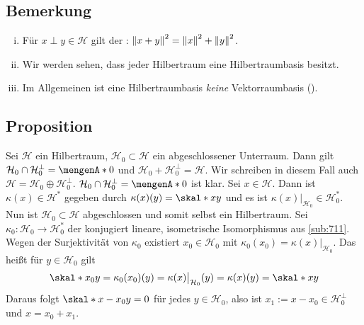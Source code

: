 \subsection[Bemerkung: Satz von Pythagoras, Vergleich Hilbertraumbasis mit Vektorbasis]{Bemerkung} %
\label{sub:714}
\begin{enumerate}[(i)]
	\item Für $x \perp y \in \mathcal{H}$ gilt der : $\norm{x+y}^2 = \norm{x}^2  + \norm{y}^2$.
	\item Wir werden sehen, dass jeder Hilbertraum eine Hilbertraumbasis besitzt.
	\item Im Allgemeinen ist eine Hilbertraumbasis \emph{keine} Vektorraumbasis ().
\end{enumerate}

\subsection[Proposition: Für einen abgeschlossenen Unterraum $\mathcal{H}_0$ gilt $\mathcal{H}= \mathcal{H}_0 \oplus \mathcal{H}_0^\bot$]{Proposition} %
\label{sub:715}
Sei $\mathcal{H}$ ein Hilbertraum, $\mathcal{H}_0 \subset \mathcal{H}$ ein abgeschlossener Unterraum. Dann gilt $\mathcal{H}_0 \cap \mathcal{H}_0^\bot = \set{0}$ und 
$\mathcal{H}_0 + \mathcal{H}_0^\bot = \mathcal{H}$. Wir schreiben in diesem Fall auch $\mathcal{H} = \mathcal{H}_0 \oplus \mathcal{H}_0^\bot$.
$\mathcal{H}_0 \cap \mathcal{H}_0^\bot= \set{0}$ ist klar. Sei $x \in \mathcal{H}$. Dann ist $\kappa(x) \in \mathcal{H}^*$ gegeben durch 
$\kappa(x)(y)=\skal*{x}{y}$ und es ist $\kappa(x)|_{\mathcal{H}_0} \in \mathcal{H}_0^*$. Nun ist $\mathcal{H}_0 \subset \mathcal{H}$ abgeschlossen und somit selbst ein 
Hilbertraum. Sei $\kappa_0 \colon \mathcal{H}_0 \to \mathcal{H}_0^*$ der konjugiert lineare, isometrische Isomorphismus aus \ref{sub:711}. Wegen der Surjektivität von 
$\kappa_0$ existiert $x_0 \in \mathcal{H}_0$ mit $\kappa_0(x_0)= \kappa(x)|_{\mathcal{H}_0}$. Das heißt für $y \in \mathcal{H}_0$ gilt 
\begin{align*}
	\skal*{x_0}{y} = \kappa_0(x_0)(y) = \kappa(x)\big|_{\mathcal{H}_0}(y) = \kappa(x)(y) = \skal*{x}{y}
\end{align*}
Daraus folgt $\skal*{x-x_0}{y}=0$ für jedes $y \in \mathcal{H}_0$, also ist $x_1 := x-x_0 \in \mathcal{H}_0^\bot$ und $x=x_0+x_1$. \bewende

